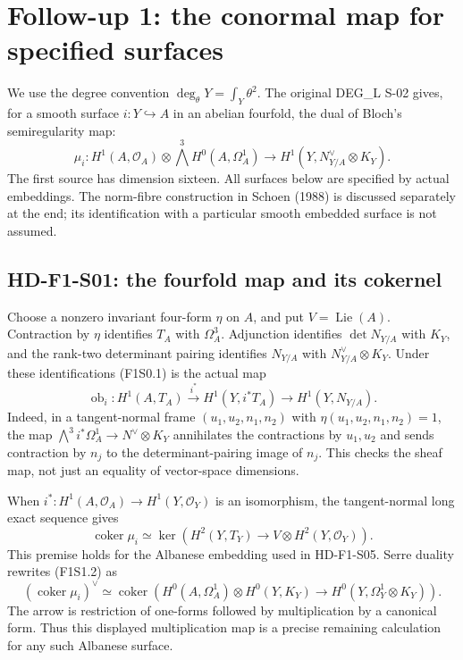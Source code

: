 
\section{Follow-up 1: the conormal map for specified surfaces}
\label{sec:f1-fixed-surface}

We use the degree convention $\deg_\theta Y=\int_Y\theta^2$.
The original DEG\_L S-02 gives, for a smooth surface $i:Y\hookrightarrow A$
in an abelian fourfold, the dual of Bloch's semiregularity map:
\[
 \mu_i:H^1(A,\mathcal O_A)\otimes\bigwedge^3H^0(A,\Omega_A^1)
       \longrightarrow H^1(Y,N_{Y/A}^{\vee}\otimes K_Y).
 \tag{F1S0.1}
\]
The first source has dimension sixteen. All surfaces below are specified
by actual embeddings. The norm-fibre construction in Schoen (1988) is
discussed separately at the end; its identification with a particular
smooth embedded surface is not assumed.

\subsection{HD-F1-S01: the fourfold map and its cokernel}

Choose a nonzero invariant four-form $\eta$ on $A$, and put
$V=\operatorname{Lie}(A)$. Contraction by $\eta$ identifies
$T_A$ with $\Omega_A^3$. Adjunction identifies $\det N_{Y/A}$ with
$K_Y$, and the rank-two determinant pairing identifies
$N_{Y/A}$ with $N_{Y/A}^{\vee}\otimes K_Y$.
Under these identifications (F1S0.1) is the actual map
\[
 \operatorname{ob}_i:H^1(A,T_A)\xrightarrow{i^*}
 H^1(Y,i^*T_A)\longrightarrow H^1(Y,N_{Y/A}).
 \tag{F1S1.1}
\]
Indeed, in a tangent-normal frame $(u_1,u_2,n_1,n_2)$ with
$\eta(u_1,u_2,n_1,n_2)=1$, the map
$\bigwedge^3i^*\Omega_A^1\to N^{\vee}\otimes K_Y$
annihilates the contractions by $u_1,u_2$ and sends contraction by
$n_j$ to the determinant-pairing image of $n_j$. This checks the
sheaf map, not just an equality of vector-space dimensions.

When $i^*:H^1(A,\mathcal O_A)\to H^1(Y,\mathcal O_Y)$ is an
isomorphism, the tangent-normal long exact sequence gives
\[
 \operatorname{coker}\mu_i\simeq
 \ker\left(H^2(Y,T_Y)\longrightarrow V\otimes H^2(Y,\mathcal O_Y)\right).
 \tag{F1S1.2}
\]
This premise holds for the Albanese embedding used in HD-F1-S05.
Serre duality rewrites (F1S1.2) as
\[
 (\operatorname{coker}\mu_i)^\vee\simeq
 \operatorname{coker}\left(
 H^0(A,\Omega_A^1)\otimes H^0(Y,K_Y)
 \longrightarrow H^0(Y,\Omega_Y^1\otimes K_Y)\right).
 \tag{F1S1.3}
\]
The arrow is restriction of one-forms followed by multiplication by a
canonical form. Thus this displayed multiplication map is a precise
remaining calculation for any such Albanese surface.

